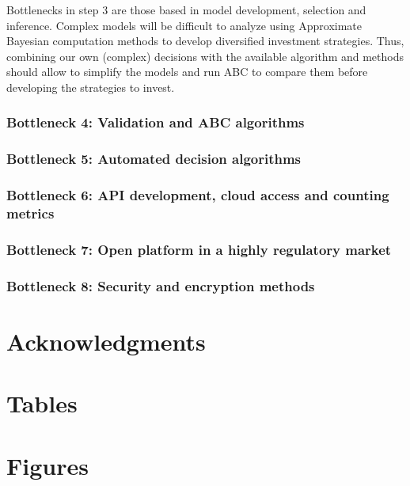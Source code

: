 \documentclass[english,12pt]{article}
\begin{document}
Bottlenecks in step 3 are those based in model development, selection
and inference. Complex models will be difficult to analyze using
Approximate Bayesian computation methods to develop diversified
investment strategies. Thus, combining our own (complex) decisions
with the available algorithm and methods should allow to simplify the
models and run ABC to compare them before developing the strategies to
invest.

\subsubsection{Bottleneck 4: Validation and ABC algorithms}

\subsubsection{Bottleneck 5: Automated decision algorithms}

\subsubsection{Bottleneck 6: API development, cloud access and counting metrics}

\subsubsection{Bottleneck 7: Open platform in a highly regulatory market}

\subsubsection{Bottleneck 8: Security and encryption methods}



\newpage
\section{Acknowledgments}


\newpage



\newpage

\section{Tables}


\newpage

\section{Figures}
\end{document}
